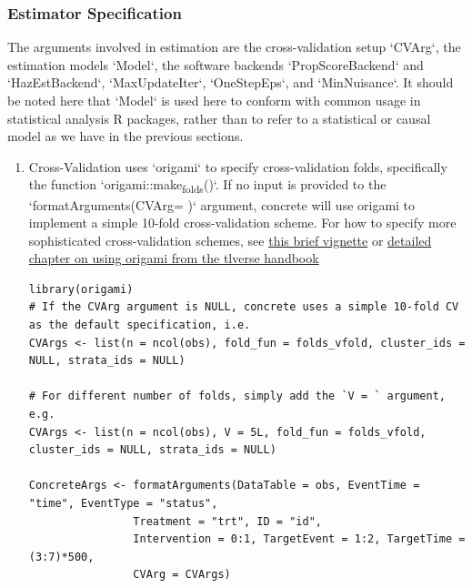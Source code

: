 \documentclass{report}
\newcommand{\1}{\ensuremath{\mathbf{1}}}
\begin{document}
\subsubsection{Estimator Specification}
\label{EstimationSpec}
The arguments involved in estimation are the cross-validation setup `CVArg`, the estimation models `Model`, the software backends `PropScoreBackend` and `HazEstBackend`, `MaxUpdateIter`, `OneStepEps`, and `MinNuisance`. It should be noted here that `Model` is used here to conform with common usage in statistical analysis R packages, rather than to refer to a statistical or causal model as we have in the previous sections. 

\begin{enumerate}
\item Cross-Validation
\label{CV}
 uses `origami` to specify cross-validation folds, specifically the function `origami::make\textsubscript{folds}()`. If no input is provided to the `formatArguments(CVArg= )` argument, concrete will use origami to implement a simple 10-fold cross-validation scheme. For how to specify more sophisticated cross-validation schemes, see \href{https://tlverse.org/origami/articles/generalizedCV.html}{this brief vignette} or \href{https://tlverse.org/tlverse-handbook/origami.html}{detailed chapter on using origami from the tlverse handbook}

\begin{lstlisting}
library(origami)
# If the CVArg argument is NULL, concrete uses a simple 10-fold CV as the default specification, i.e.
CVArgs <- list(n = ncol(obs), fold_fun = folds_vfold, cluster_ids = NULL, strata_ids = NULL)

# For different number of folds, simply add the `V = ` argument, e.g. 
CVArgs <- list(n = ncol(obs), V = 5L, fold_fun = folds_vfold, cluster_ids = NULL, strata_ids = NULL)

ConcreteArgs <- formatArguments(DataTable = obs, EventTime = "time", EventType = "status", 
				Treatment = "trt", ID = "id", 
				Intervention = 0:1, TargetEvent = 1:2, TargetTime = (3:7)*500, 
				CVArg = CVArgs)
\end{lstlisting}


\end{enumerate}
\end{document}
